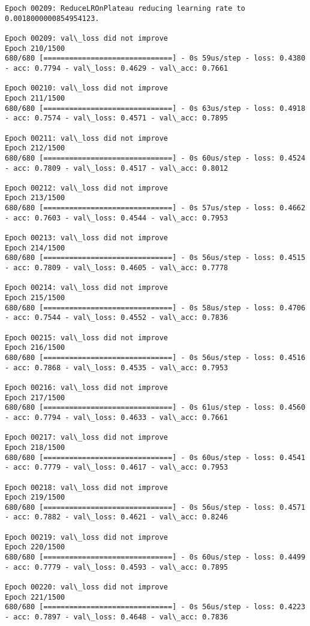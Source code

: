 \documentclass[11pt]{article}
\begin{document}
\begin{Verbatim}[commandchars=\\\{\}]
Epoch 00209: ReduceLROnPlateau reducing learning rate to 0.0018000000854954123.

Epoch 00209: val\_loss did not improve
Epoch 210/1500
680/680 [==============================] - 0s 59us/step - loss: 0.4380 - acc: 0.7794 - val\_loss: 0.4629 - val\_acc: 0.7661

Epoch 00210: val\_loss did not improve
Epoch 211/1500
680/680 [==============================] - 0s 63us/step - loss: 0.4918 - acc: 0.7574 - val\_loss: 0.4571 - val\_acc: 0.7895

Epoch 00211: val\_loss did not improve
Epoch 212/1500
680/680 [==============================] - 0s 60us/step - loss: 0.4524 - acc: 0.7809 - val\_loss: 0.4517 - val\_acc: 0.8012

Epoch 00212: val\_loss did not improve
Epoch 213/1500
680/680 [==============================] - 0s 57us/step - loss: 0.4662 - acc: 0.7603 - val\_loss: 0.4544 - val\_acc: 0.7953

Epoch 00213: val\_loss did not improve
Epoch 214/1500
680/680 [==============================] - 0s 56us/step - loss: 0.4515 - acc: 0.7809 - val\_loss: 0.4605 - val\_acc: 0.7778

Epoch 00214: val\_loss did not improve
Epoch 215/1500
680/680 [==============================] - 0s 58us/step - loss: 0.4706 - acc: 0.7544 - val\_loss: 0.4552 - val\_acc: 0.7836

Epoch 00215: val\_loss did not improve
Epoch 216/1500
680/680 [==============================] - 0s 56us/step - loss: 0.4516 - acc: 0.7868 - val\_loss: 0.4535 - val\_acc: 0.7953

Epoch 00216: val\_loss did not improve
Epoch 217/1500
680/680 [==============================] - 0s 61us/step - loss: 0.4560 - acc: 0.7794 - val\_loss: 0.4633 - val\_acc: 0.7661

Epoch 00217: val\_loss did not improve
Epoch 218/1500
680/680 [==============================] - 0s 60us/step - loss: 0.4541 - acc: 0.7779 - val\_loss: 0.4617 - val\_acc: 0.7953

Epoch 00218: val\_loss did not improve
Epoch 219/1500
680/680 [==============================] - 0s 56us/step - loss: 0.4571 - acc: 0.7882 - val\_loss: 0.4621 - val\_acc: 0.8246

Epoch 00219: val\_loss did not improve
Epoch 220/1500
680/680 [==============================] - 0s 60us/step - loss: 0.4499 - acc: 0.7779 - val\_loss: 0.4593 - val\_acc: 0.7895

Epoch 00220: val\_loss did not improve
Epoch 221/1500
680/680 [==============================] - 0s 56us/step - loss: 0.4223 - acc: 0.7897 - val\_loss: 0.4648 - val\_acc: 0.7836


\end{Verbatim}
\end{document}
